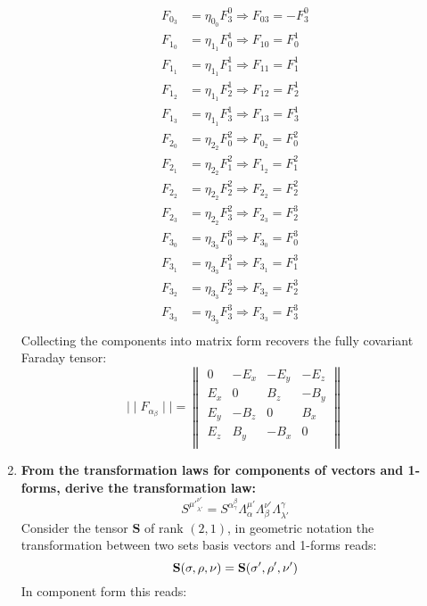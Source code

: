 \documentclass[9pt]{report}
\begin{document}
\begin{enumerate}
\[\begin{align}
        F_0_3 &= \eta_0_0 F_3^0 \Rightarrow F_{03} = -F^0_3\\
        F_1_0 &= \eta_1_1 F_0^1 \Rightarrow F_{10} = F_0^1\\
        F_1_1 &= \eta_1_1 F_1^1 \Rightarrow F_{11} = F_1^1\\
        F_1_2 &= \eta_1_1 F_2^1 \Rightarrow F_{12} = F_2^1 \\
        F_1_3 &= \eta_1_1 F_3^1 \Rightarrow F_{13} = F_3^1 \\
        F_2_0 &= \eta_2_2 F_0^2 \Rightarrow F_0_2 = F_0^2 \\
        F_2_1 &= \eta_2_2 F_1^2 \Rightarrow F_1_2 = F_1^2\\
        F_2_2 &= \eta_2_2 F_2^2 \Rightarrow F_2_2 = F_2^2\\
        F_2_3 &= \eta_2_2 F_3^2 \Rightarrow F_2_3 = F_2^3 \\
        F_3_0 &= \eta_3_3 F_0^3 \Rightarrow F_3_0 = F_0^3\\
        F_3_1 &= \eta_3_3 F_1^3 \Rightarrow F_3_1 = F_1^3\\
        F_3_2 &= \eta_3_3 F_2^3 \Rightarrow F_3_2 = F_2^3\\
        F_3_3 &= \eta_3_3 F_3^3 \Rightarrow F_3_3 = F_3^3\\
      \end{align}
    \]
    Collecting the components into matrix form recovers the fully covariant
    Faraday tensor:
    \begin{equation}
       \mid  \mid F_\alpha_\beta  \mid \mid =
       \begin{Vmatrix}
         0 & -E_x & -E_y & -E_z\\
         E_x & 0 & B_z & -B_y\\
         E_y & -B_z & 0 & B_x\\
         E_z & B_y & -B_x & 0\\
       \end{Vmatrix}
     \end{equation}
\item \textbf{From the transformation laws for components of vectors and 1-forms,
  derive the transformation law:}
  \[
    S^{\mu'}^{\nu'}_{\lambda'} = S^\alpha^\beta_\gamma \Lambda^{\mu'}_\alpha \Lambda^{\nu'}_\beta \Lambda^\gamma_{\lambda'}
  \]
  Consider the tensor $\textbf{S}$ of rank $(2, 1)$, in geometric notation the transformation between
  two sets basis vectors and 1-forms reads:
  \[
  \textbf{S}(\bf{\sigma}, \bf{\rho}, \bf{\nu}) =
  \textbf{S}(\bf{\sigma'}, \bf{\rho'}, \bf{\nu'})
  \]
  In component form this reads:

\end{enumerate}
\end{document}

